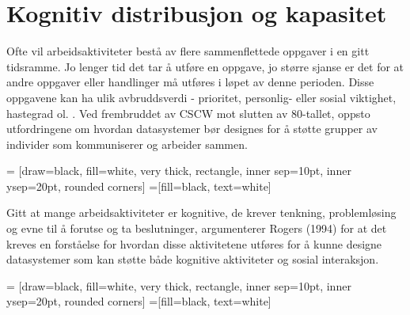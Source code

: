 \section{Kognitiv distribusjon og kapasitet}
\label{chp: kognisjon}

Ofte vil arbeidsaktiviteter bestå av flere sammenflettede oppgaver i en gitt tidsramme. Jo lenger tid det tar å utføre en oppgave, jo større sjanse er det for at andre oppgaver eller handlinger må utføres i løpet av denne perioden. Disse oppgavene kan ha ulik avbruddsverdi - prioritet, personlig- eller sosial viktighet, hastegrad ol. \cite{Rogers94}. 
Ved frembruddet av CSCW mot slutten av 80-tallet, oppsto utfordringene om hvordan datasystemer bør designes for å støtte grupper av individer som kommuniserer og arbeider sammen. 

 = [draw=black, fill=white, very thick,
    rectangle, inner sep=10pt, inner ysep=20pt, rounded corners]
 =[fill=black, text=white]
%


\noindent
Gitt at mange arbeidsaktiviteter er kognitive, de krever tenkning, problemløsing og evne til å forutse og ta beslutninger, argumenterer Rogers (1994) for at det kreves en forståelse for hvordan disse aktivitetene utføres for å kunne designe datasystemer som kan støtte både kognitive aktiviteter og sosial interaksjon.

 = [draw=black, fill=white, very thick,
    rectangle, inner sep=10pt, inner ysep=20pt, rounded corners]
 =[fill=black, text=white]
%

